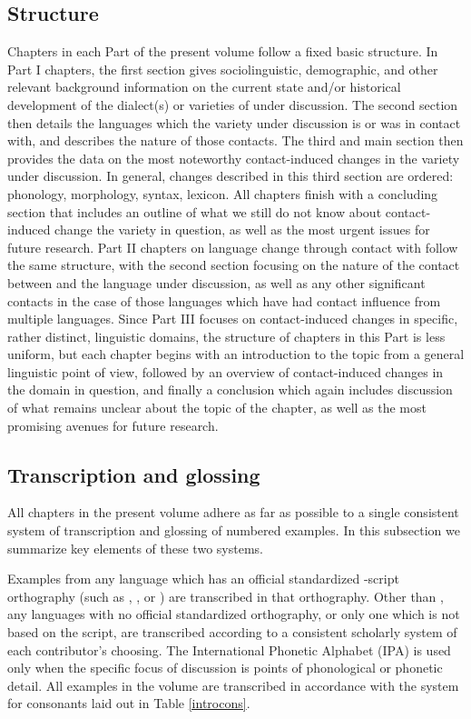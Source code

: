 \documentclass[output=paper]{langsci/langscibook}
\begin{document}
\subsection{Structure}
Chapters in each Part of the present volume follow a fixed basic structure. In Part I chapters, the first section gives sociolinguistic, demographic, and other relevant background information on the current state and/or historical development of the dialect(s) or varieties of  under discussion. The second section then details the languages which the variety under discussion is or was in contact with, and describes the nature of those contacts. The third and main section then provides the data on the most noteworthy contact-induced changes in the variety under discussion. In general, changes described in this third section are ordered: phonology, morphology, syntax, lexicon. All chapters finish with a concluding section that includes an outline of what we still do not know about contact-induced change the variety in question, as well as the most urgent issues for {future} research. Part II chapters on {language change} through contact with  follow the same structure, with the second section {focusing} on the nature of the contact between  and the language under discussion, as well as any other significant contacts in the case of those languages which have had contact influence from multiple languages. Since Part III focuses on contact-induced changes in specific, rather distinct, linguistic domains, the structure of chapters in this Part is less uniform, but each chapter begins with an introduction to the topic from a general linguistic point of view, followed by an overview of contact-induced changes in the domain in question, and finally a conclusion which again includes discussion of what remains unclear about the topic of the chapter, as well as the most promising avenues for {future} research.

\subsection{Transcription and glossing}\largerpage

All chapters in the present volume adhere as far as possible to a single consistent system of transcription and glossing of numbered examples. In this subsection we summarize key elements of these two systems.


Examples from any language which has an official standardized -script {orthography} (such as , , or ) are transcribed in that {orthography}. Other than , any languages with no official standardized {orthography}, or only one which is not based on the  script, are transcribed according to a consistent scholarly system of each contributor's choosing. The International Phonetic Alphabet (IPA) is used only when the specific focus of discussion is points of phonological or phonetic detail. All  examples in the volume are transcribed in accordance with the system for consonants laid out in Table \ref{introcons}.
\end{document}
